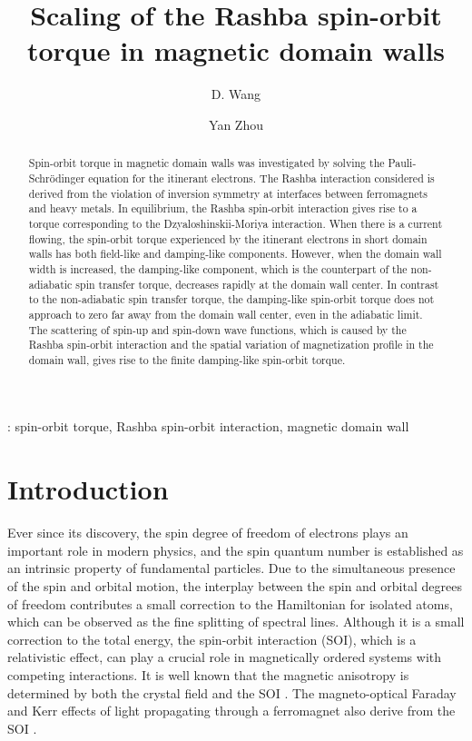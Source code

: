 \documentclass[12pt]{iopart}
\begin{document}
\title[]{Scaling of the Rashba spin-orbit torque in magnetic domain walls}
\author{D. Wang}
\address{College of Engineering Physics, Shenzhen Technology University, Shenzhen 518118,\\ Guangdong, China}
\author{Yan Zhou}
\address{School of Science and Engineering, The Chinese University of Hong Kong, Shenzhen,\\ Shenzhen 518172, Guangdong, China}
\begin{abstract}
Spin-orbit torque in magnetic domain walls was investigated by solving the Pauli-Schr\"{o}dinger equation for the itinerant electrons. The Rashba interaction considered is derived from the violation of inversion symmetry at interfaces between ferromagnets and heavy metals. In equilibrium, the Rashba spin-orbit interaction gives rise to a torque corresponding to the Dzyaloshinskii-Moriya interaction. When there is a current flowing, the spin-orbit torque experienced by the itinerant electrons in short domain walls has both field-like and damping-like components. However, when the domain wall width is increased, the damping-like component, which is the counterpart of the non-adiabatic spin transfer torque, decreases rapidly at the domain wall center. In contrast to the non-adiabatic spin transfer torque, the damping-like spin-orbit torque does not approach to zero far away from the domain wall center, even in the adiabatic limit. The scattering of spin-up and spin-down wave functions, which is caused by the Rashba spin-orbit interaction and the spatial variation of magnetization profile in the domain wall, gives rise to the finite damping-like spin-orbit torque.
\end{abstract}
: spin-orbit torque, Rashba spin-orbit interaction, magnetic domain wall
\maketitle

\section{Introduction}
Ever since its discovery, the spin degree of freedom of electrons plays an important role in modern physics, and the spin quantum number is established as an intrinsic property of fundamental particles. Due to the simultaneous presence of the spin and orbital motion, the interplay between the spin and orbital degrees of freedom contributes a small correction to the Hamiltonian for isolated atoms, which can be observed as the fine splitting of spectral lines. Although it is a small correction to the total energy, the spin-orbit interaction (SOI), which is a relativistic effect, can play a crucial role in magnetically ordered systems with competing interactions. It is well known that the magnetic anisotropy is determined by both the crystal field and the SOI \cite{O'Handley,Hubert98}. The magneto-optical Faraday and Kerr effects of light propagating through a ferromagnet also derive from the SOI \cite{mo}.
\end{document}
